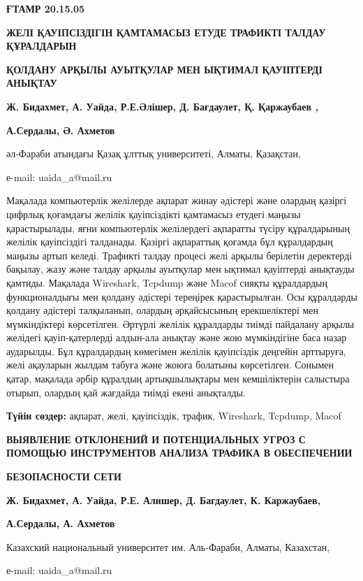 {\bfseries ҒТАМР 20.15.05}

{\bfseries ЖЕЛІ ҚАУІПСІЗДІГІН ҚАМТАМАСЫЗ ЕТУДЕ ТРАФИКТІ ТАЛДАУ ҚҰРАЛДАРЫН}

{\bfseries ҚОЛДАНУ АРҚЫЛЫ АУЫТҚУЛАР МЕН ЫҚТИМАЛ ҚАУІПТЕРДІ АНЫҚТАУ}

{\bfseries Ж. Бидахмет, А. Уайда, Р.Е.Әлішер, Д. Бағдаулет, Қ. Қаржаубаев
,}

{\bfseries А.Сердалы, Ә. Ахметов}

әл-Фараби атындағы Қазақ ұлттық университеті, Алматы, Қазақстан,

е-mail: uaida\_a@mail.ru

Мақалада компьютерлік желілерде ақпарат жинау әдістері және олардың
қазіргі цифрлық қоғамдағы желілік қауіпсіздікті қамтамасыз етудегі
маңызы қарастырылады, яғни компьютерлік желілердегі ақпаратты түсіру
құралдарының желілік қауіпсіздігі талданады. Қазіргі ақпараттық қоғамда
бұл құралдардың маңызы артып келеді. Трафикті талдау процесі желі арқылы
берілетін деректерді бақылау, жазу және талдау арқылы ауытқулар мен
ықтимал қауіптерді анықтауды қамтиды. Мақалада Wireshark, Tcpdump және
Macof сияқты құралдардың функционалдығы мен қолдану әдістері тереңірек
қарастырылған. Осы құралдарды қолдану әдістері талқыланып, олардың
әрқайсысының ерекшеліктері мен мүмкіндіктері көрсетілген. Әртүрлі
желілік құралдарды тиімді пайдалану арқылы желідегі қауіп-қатерлерді
алдын-ала анықтау және жою мүмкіндігіне баса назар аударылды. Бұл
құралдардың көмегімен желілік қауіпсіздік деңгейін арттыруға, желі
ақауларын жылдам табуға және жоюға болатыны көрсетілген. Сонымен қатар,
мақалада әрбір құралдың артықшылықтары мен кемшіліктерін салыстыра
отырып, олардың қай жағдайда тиімді екені анықталды.

{\bfseries Түйін сөздер:} ақпарат, желі, қауіпсіздік, трафик, Wireshark,
Tcpdump, Macof

{\bfseries ВЫЯВЛЕНИЕ ОТКЛОНЕНИЙ И ПОТЕНЦИАЛЬНЫХ УГРОЗ С ПОМОЩЬЮ
ИНСТРУМЕНТОВ АНАЛИЗА ТРАФИКА В ОБЕСПЕЧЕНИИ}

{\bfseries БЕЗОПАСНОСТИ СЕТИ}

{\bfseries Ж. Бидахмет, А. Уайда, Р.Е. Алишер, Д. Багдаулет, К.
Каржаубаев,}

{\bfseries А.Сердалы, А. Ахметов}

Казахский национальный университет им. Аль-Фараби, Алматы, Казахстан,

е-mail: uaida\_a@mail.ru

